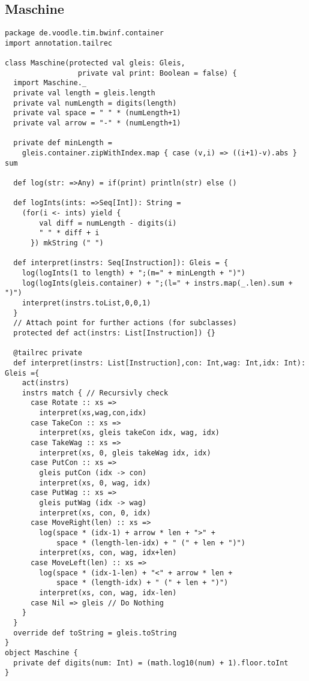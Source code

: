 \subsection{Maschine}
\begin{lstlisting}
package de.voodle.tim.bwinf.container
import annotation.tailrec

class Maschine(protected val gleis: Gleis,
                 private val print: Boolean = false) {
  import Maschine._
  private val length = gleis.length
  private val numLength = digits(length)
  private val space = " " * (numLength+1)
  private val arrow = "-" * (numLength+1)

  private def minLength =
    gleis.container.zipWithIndex.map { case (v,i) => ((i+1)-v).abs } sum

  def log(str: =>Any) = if(print) println(str) else ()
  
  def logInts(ints: =>Seq[Int]): String =
    (for(i <- ints) yield {
        val diff = numLength - digits(i)
        " " * diff + i
      }) mkString (" ")

  def interpret(instrs: Seq[Instruction]): Gleis = {
    log(logInts(1 to length) + ";(m=" + minLength + ")")
    log(logInts(gleis.container) + ";(l=" + instrs.map(_.len).sum + ")")
    interpret(instrs.toList,0,0,1)
  }
  // Attach point for further actions (for subclasses)
  protected def act(instrs: List[Instruction]) {}
  
  @tailrec private
  def interpret(instrs: List[Instruction],con: Int,wag: Int,idx: Int): Gleis ={
    act(instrs)
    instrs match { // Recursivly check
      case Rotate :: xs =>
        interpret(xs,wag,con,idx)
      case TakeCon :: xs =>
        interpret(xs, gleis takeCon idx, wag, idx)
      case TakeWag :: xs =>
        interpret(xs, 0, gleis takeWag idx, idx)
      case PutCon :: xs =>
        gleis putCon (idx -> con)
        interpret(xs, 0, wag, idx)
      case PutWag :: xs =>
        gleis putWag (idx -> wag)
        interpret(xs, con, 0, idx)
      case MoveRight(len) :: xs =>
        log(space * (idx-1) + arrow * len + ">" +
            space * (length-len-idx) + " (" + len + ")")
        interpret(xs, con, wag, idx+len)
      case MoveLeft(len) :: xs =>
        log(space * (idx-1-len) + "<" + arrow * len +
            space * (length-idx) + " (" + len + ")")
        interpret(xs, con, wag, idx-len)
      case Nil => gleis // Do Nothing
    }
  }
  override def toString = gleis.toString
}
object Maschine {
  private def digits(num: Int) = (math.log10(num) + 1).floor.toInt
}
\end{lstlisting}
\clearpage
\addtolength{\footskip}{-1.8cm}
